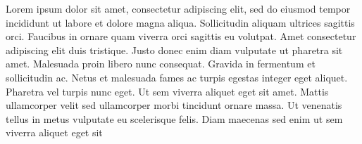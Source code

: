 \documentclass[12pt,
 reprint,
nofootinbib,
 amsmath,amssymb,
 aps,
floatfix,
]{revtex4-2}
\begin{document}
Lorem ipsum dolor sit amet, consectetur adipiscing elit, sed do eiusmod tempor incididunt ut labore et dolore magna aliqua. Sollicitudin aliquam ultrices sagittis orci. Faucibus in ornare quam viverra orci sagittis eu volutpat. Amet consectetur adipiscing elit duis tristique. Justo donec enim diam vulputate ut pharetra sit amet. Malesuada proin libero nunc consequat. Gravida in fermentum et sollicitudin ac. Netus et malesuada fames ac turpis egestas integer eget aliquet. Pharetra vel turpis nunc eget. Ut sem viverra aliquet eget sit amet. Mattis ullamcorper velit sed ullamcorper morbi tincidunt ornare massa. Ut venenatis tellus in metus vulputate eu scelerisque felis. Diam maecenas sed enim ut sem viverra aliquet eget sit

\newpage

% 
% 
\end{document}
